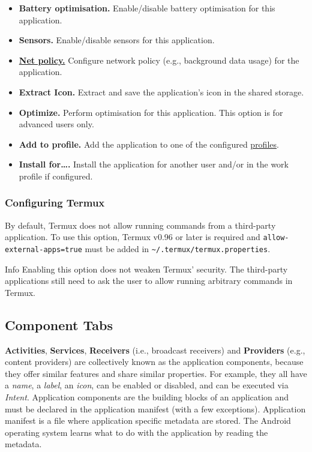 \begin{itemize}
    \item \textbf{Battery optimisation.} Enable/disable battery optimisation for this application.

    \item \textbf{Sensors.} Enable/disable sensors for this application.

    \item \hyperref[sec:net-policy]{\textbf{Net policy.}} Configure network policy (e.g., background data usage) for the
    application.

    \item \textbf{Extract Icon.} Extract and save the application's icon in the shared storage.

    \item \textbf{Optimize.} Perform optimisation for this application. This option is for advanced
    users only.

    \item \textbf{Add to profile.} Add the application to one of the configured \hyperref[sec:profile-page]{profiles}.

    \item \textbf{Install for….} Install the application for another user and/or in the work profile if configured.
\end{itemize}

\subsubsection{Configuring Termux}\label{subsubsec:config-termux} %
By default, Termux does not allow running commands from a third-party application. To use this option, Termux v0.96 or
later is required and \texttt{allow-external-apps=true} must be added in \texttt{\textasciitilde/.termux/termux.properties}.

\begin{tip}{Info}
    Enabling this option does not weaken Termux' security. The third-party applications still need to ask the user to
    allow running arbitrary commands in Termux.
\end{tip}

\subsection{Component Tabs}\label{subsec:component-tabs} %
\textbf{Activities}, \textbf{Services}, \textbf{Receivers} (i.e., broadcast receivers) and
\textbf{Providers} (e.g., content providers) are collectively known as the application components,
because they offer similar features and share similar properties. For example, they all have a
\textit{name}, a \textit{label}, an \textit{icon}, can be enabled or disabled, and can be executed
via \textit{Intent}. Application components are the building blocks of an application and must be
declared in the application manifest (with a few exceptions). Application manifest is a file where
application specific metadata are stored. The Android operating system learns what to do with the
application by reading the metadata.

